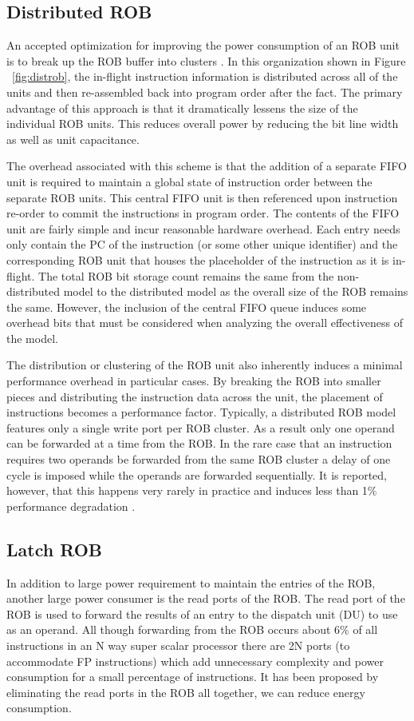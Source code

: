 \subsection{Distributed ROB}
An accepted optimization for improving the power consumption of an ROB unit
is to break up the ROB buffer into clusters \cite{rabaey}.  In this organization shown in Figure ~\ref{fig:distrob},
the in-flight
instruction information is distributed across all of the units and then re-assembled
back into program order after the fact.  The primary advantage of this approach
is that it dramatically lessens the size of the individual ROB units.  This reduces overall
power by reducing the bit line width as well as unit capacitance.



The overhead associated with this scheme is that the addition of a separate FIFO unit
is required to maintain a global state of instruction order between the separate ROB units.
This central FIFO unit is then referenced upon instruction re-order to commit the instructions
in program order.  The contents of the FIFO unit are fairly simple and incur reasonable hardware
overhead.  Each entry needs only contain the PC of the instruction (or some other unique identifier)
and the corresponding ROB unit that houses the placeholder of the instruction as it is in-flight. 
The total ROB bit storage count remains the same from the non-distributed model to the distributed model
as the overall size of the ROB remains the same.  However, the inclusion of the central FIFO queue 
induces some overhead bits that must be considered when analyzing the overall effectiveness of the 
model.  

The distribution or clustering of the ROB unit also inherently induces a minimal performance overhead 
in particular cases.  By breaking the ROB into smaller pieces and distributing the instruction 
data across the unit, the placement of instructions becomes a performance factor.  Typically, a 
distributed ROB model features only a single write port per ROB cluster.  As a result only one operand 
can be forwarded at a time from the ROB.  In the rare case that an instruction requires two operands be 
forwarded from the same ROB cluster a delay of one cycle is imposed while the operands are forwarded 
sequentially.  It is reported, however, that this happens very rarely in practice and induces less than 1\% 
performance degradation \cite{rabaey}.
\subsection{Latch ROB}
In addition to large power requirement to maintain the entries of the ROB, another 
large power consumer is the read ports of the ROB.  The read port of the ROB is used
to forward the results of an entry to the dispatch unit (DU) to use as an operand.
All though forwarding from the ROB occurs about 6\%\cite{kucuk} of all instructions 
in an N way super scalar processor there are 2N ports (to accommodate FP
 instructions) which add unnecessary complexity and power consumption for a small 
percentage of instructions.  It has been proposed by eliminating the read ports 
in the ROB all together, we can reduce energy consumption\cite{kucuk}.

